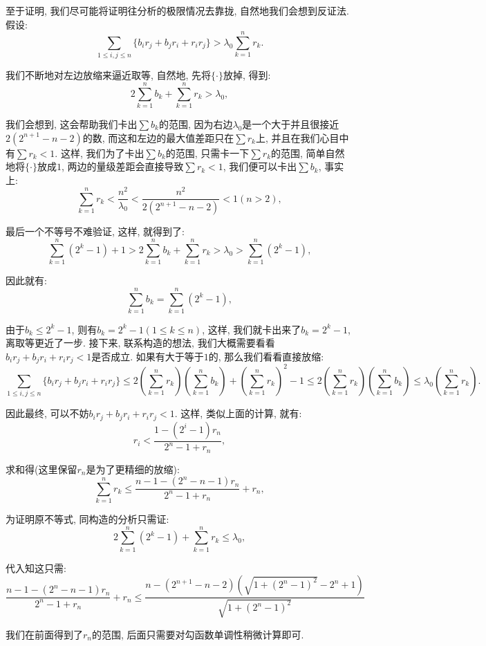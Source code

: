 \documentclass[lang=cn,12pt,thmcnt=section]{elegantbook}
\begin{document}
\begin{analysis}
至于证明, 我们尽可能将证明往分析的极限情况去靠拢, 自然地我们会想到反证法. 假设: 
\[
\sum_{1\le i,j\le n}\{b_ir_j+b_jr_i+r_ir_j\}>  \lambda_0\sum_{k=1}^n r_k.
\]

我们不断地对左边放缩来逼近取等, 自然地, 先将$\{\cdot{}\}$放掉, 得到: 
\[
2\sum_{k=1}^n b_k+\sum_{k=1}^n r_k > \lambda_0,
\]

我们会想到, 这会帮助我们卡出$\sum b_k$的范围, 因为右边$\lambda_0$是一个大于并且很接近$2(2^{n+1}-n-2)$的数, 而这和左边的最大值差距只在$\sum r_k$上, 并且在我们心目中有$\sum r_k<1$. 这样, 我们为了卡出$\sum b_k$的范围, 只需卡一下$\sum r_k$的范围, 简单自然地将$\{\cdot{}\}$放成$1$, 两边的量级差距会直接导致$\sum r_k<1$, 我们便可以卡出$\sum b_k$, 事实上: 
\[
\sum_{k=1}^n r_k< \frac{n^2}{\lambda_0}<\frac{n^2}{2(2^{n+1}-n-2)}<1(n>2),
\]

最后一个不等号不难验证, 这样, 就得到了: 
\[
\sum_{k=1}^n (2^k-1)+1>2\sum_{k=1}^n b_k+\sum_{k=1}^n r_k > \lambda_0>\sum_{k=1}^n (2^k-1),
\]

因此就有: 
\[
\sum_{k=1}^n b_k=\sum_{k=1}^n (2^k-1),
\]

由于$b_k\le 2^k-1$, 则有$b_k=2^k-1(1\le k\le n)$, 这样, 我们就卡出来了$b_k=2^k-1$, 离取等更近了一步. 接下来, 联系构造的想法, 我们大概需要看看$b_ir_j+b_jr_i+r_ir_j< 1$是否成立. 如果有大于等于$1$的, 那么我们看看直接放缩: 
\[
\sum_{1\le i,j\le n}\{b_ir_j+b_jr_i+r_ir_j\}\le 2\left(\sum_{k=1}^n r_k\right)\left(\sum_{k=1}^n b_k\right)+\left(\sum_{k=1}^n r_k\right)^2-1\le 2\left(\sum_{k=1}^n r_k\right)\left(\sum_{k=1}^n b_k\right)\le \lambda_0\left(\sum_{k=1}^n r_k\right).
\]

因此最终, 可以不妨$b_ir_j+b_jr_i+r_ir_j< 1$. 这样, 类似上面的计算, 就有: 
\[
r_i<\frac{1-(2^i-1)r_n}{2^n-1+r_n},
\]

求和得(这里保留$r_n$是为了更精细的放缩): 
\[
\sum_{k=1}^n r_k\le \frac{n-1-(2^{n}-n-1)r_n}{2^n-1+r_n}+r_n,
\]

为证明原不等式, 同构造的分析只需证: 
\[
2\sum_{k=1}^n (2^k-1)+\sum_{k=1}^n r_k \le \lambda_0,
\]

代入知这只需:
\[
\frac{n-1-(2^{n}-n-1)r_n}{2^n-1+r_n}+r_n\le \frac{n-(2^{n+1}-n-2)(\sqrt{1+(2^n-1)^2}-2^n+1)}{\sqrt{1+(2^n-1)^2}}
\]

我们在前面得到了$r_n$的范围, 后面只需要对勾函数单调性稍微计算即可. 

\end{analysis}
\end{document}

